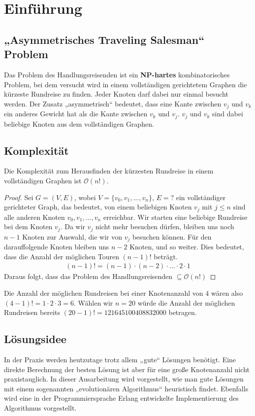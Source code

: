 \section{Einführung}
\subsection{„Asymmetrisches Traveling Salesman“ Problem}
Das Problem des Handlungsreisenden ist ein
\textbf{NP-hartes} kombinatorisches Problem, bei dem versucht wird in
einem vollständigen gerichtetem Graphen die kürzeste Rundreise zu finden. Jeder
Knoten darf dabei nur einmal besucht werden. Der Zusatz „asymmetrisch“
bedeutet, dass eine Kante zwischen $v_j$ und $v_k$ ein anderes Gewicht
hat als die Kante zwischen $v_k$ und $v_j$. $v_j$ und $v_k$ sind
dabei beliebige Knoten aus dem vollständigen Graphen.

\subsection{Komplexität}
\begin{theorem}
Die Komplexität zum Herausfinden der kürzesten Rundreise in einem
vollständigen Graphen ist $\mathcal{O}(n!)$. 
\end{theorem}

\begin{proof}
Sei $G=(V,E)$, wobei $V = \{ v_0, v_1, \dotsc, v_n\}$, $E= ?$ ein
vollständiger gerichteter Graph, das bedeutet, von einem
beliebigen Knoten $v_j$ mit $j \leq n$ sind alle anderen Knoten $v_0, v_1, \dotsc, v_n$
erreichbar. Wir starten eine beliebige Rundreise bei dem Knoten $v_j$.
Da wir $v_j$ nicht mehr besuchen dürfen, bleiben uns noch 
$n-1$ Knoten zur Auswahl, die wir von $v_j$ besuchen können. Für den
darauffolgende Knoten bleiben uns $n-2$ Knoten, und so weiter. Dies bedeutet, dass 
die Anzahl der möglichen Touren $(n-1)!$ beträgt.
\begin{align*}
  (n-1)! = (n-1) \cdot (n-2) \cdot \dotsc \cdot 2 \cdot 1
\end{align*}
Daraus folgt, dass das Problem des Handlungsreisenden $\subseteq \mathcal{O}(n!)$
\end{proof}
\begin{bem}
Die Anzahl der möglichen Rundreisen bei einer Knotenanzahl von $4$ wären also
$(4-1)! = 1 \cdot 2 \cdot 3 = 6$. Wählen wir $n = 20$ würde die
Anzahl der möglichen Rundreisen bereits $(20-1)! =
121645100408832000$ betragen.
\end{bem}

\subsection{Lösungsidee}
In der Praxis werden heutzutage trotz allem „gute“ Lösungen benötigt.
Eine direkte Berechnung der besten Lösung ist aber für eine große
Knotenanzahl nicht praxistauglich. In dieser Ausarbeitung wird
vorgestellt, wie man gute Lösungen mit einem sogenannten „evolutionären
Algorithmus“ heuristisch findet. Ebenfalls wird eine in der
Programmiersprache Erlang entwickelte Implementierung des Algorithmus 
vorgestellt.
